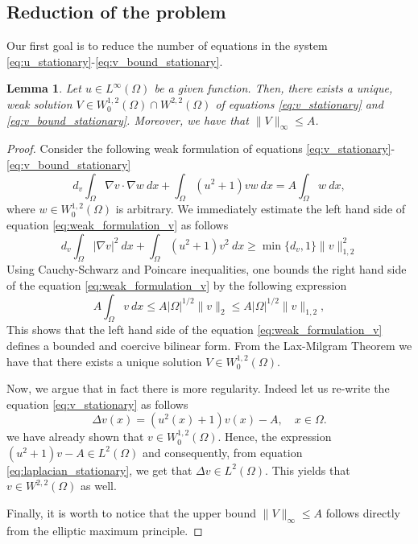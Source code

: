 \documentclass[12pt, a4paper]{article}
\theoremstyle{break}
\theoremstyle{break}
\theoremstyle{break}
\theoremstyle{break}
\theoremstyle{break}
\newtheorem{lem}{Lemma}[section]
\theoremstyle{break}
\theoremstyle{break}
\begin{document}
\subsection{Reduction of the problem} Our first goal is to reduce the number of equations in the system \eqref{eq:u_stationary}-\eqref{eq:v_bound_stationary}.
\begin{lem}
    \label{lem:existence_of_inhomogeneous_elliptic_v}
    Let $u \in L^\infty(\Omega)$ be a given function. Then, there exists a unique, weak solution $V \in W^{1,2}_0(\Omega) \cap W^{2,2}(\Omega)$ of equations \eqref{eq:v_stationary} and \eqref{eq:v_bound_stationary}. Moreover, we have that $\|V \|_\infty \leq A$.
\end{lem}
\begin{proof}
    Consider the following weak formulation of equations \eqref{eq:v_stationary}-\eqref{eq:v_bound_stationary}
    \begin{equation}
        \label{eq:weak_formulation_v}
        d_v\int_\Omega\nabla v \cdot \nabla w \:dx + \int_\Omega (u^2 + 1) v w\:dx = A \int_\Omega w \:dx,
    \end{equation}
    where $w \in W^{1,2}_0(\Omega)$ is arbitrary. We immediately estimate the left hand side of equation \eqref{eq:weak_formulation_v} as follows
    \begin{equation}
        \label{eq:coercivity_bilinear_form_v}
        d_v\int_\Omega | \nabla v |^2 \:dx + \int_\Omega (u^2 + 1) v^2\:dx \geq \min\{d_v, 1\} \|v\|_{1,2}^2
    \end{equation}
    Using Cauchy-Schwarz and Poincare inequalities, one bounds the right hand side of the equation \eqref{eq:weak_formulation_v} by the following expression
    \begin{equation}
        \label{eq:boundedness_bilinear_form_v}
        A \int_\Omega v \:dx \leq A |\Omega|^{1/2} \|v\|_2 \leq A |\Omega|^{1/2} \|v\|_{1,2},
    \end{equation}
    This shows that the left hand side of the equation \eqref{eq:weak_formulation_v} defines a bounded and coercive bilinear form. From the Lax-Milgram Theorem we have that there exists a unique solution $V \in W^{1,2}_0(\Omega)$. 

    Now, we argue that in fact there is more regularity. Indeed let us re-write the equation \eqref{eq:v_stationary} as follows
    \begin{equation}
        \label{eq:laplacian_stationary}
        \Delta v (x) = (u^2(x) + 1) v(x)  - A, \quad x \in \Omega.
    \end{equation}
    we have already shown that $v \in W^{1,2}_0(\Omega)$. Hence, the expression $(u^2 + 1)v - A \in L^2(\Omega)$ and consequently, from equation \eqref{eq:laplacian_stationary}, we get that $\Delta v \in L^2(\Omega)$. This yields that $v \in W^{2,2}(\Omega)$ as well.
    
    Finally, it is worth to notice that the upper bound $\|V\|_\infty \leq A$ follows directly from the elliptic maximum principle.
\end{proof}
\end{document}
